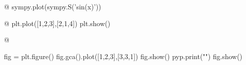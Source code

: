\documentclass{article}
\begin{document}
@{{{
sympy.plot(sympy.S('sin(x)'))
}}}

@{{{
plt.plot([1,2,3],[2,1,4])
plt.show()
}}}

@{{{

fig = plt.figure()
fig.gca().plot([1,2,3],[3,3,1])
fig.show()
pyp.print("\n\n")
fig.show()
}}}
\end{document}
